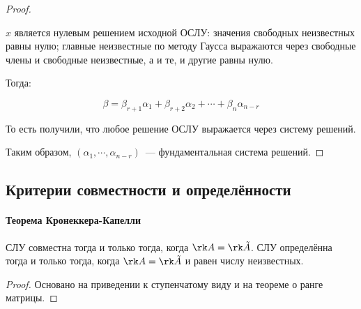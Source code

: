 \begin{proof}
\begin{enumerate}
			$x$ является нулевым решением исходной ОСЛУ: значения
			свободных неизвестных равны нулю; главные неизвестные по методу Гаусса
			выражаются через свободные члены и свободные неизвестные, а и те, и другие
			равны нулю.

			Тогда:

			$$
				\beta=
					\beta_{r+1}\alpha_1+
					\beta_{r+2}\alpha_2+
					\cdots+
					\beta_{n}\alpha_{n-r}
			$$

			То есть получили, что любое решение ОСЛУ выражается через систему решений.
	\end{enumerate}

	Таким образом, $(\alpha_1,\cdots,\alpha_{n-r})$~--- фундаментальная система решений.
\end{proof}

  \subsection{Критерии совместности и определённости}
    \paragraph{Теорема Кронеккера-Капелли}

    \begin{theorem}
      СЛУ совместна тогда и только тогда, когда $\rk A = \rk\tilde A$. СЛУ определённа тогда и только тогда, когда $\rk A=\rk\tilde A$ и равен числу неизвестных.
    \end{theorem}
    \begin{proof}
      Основано на приведении к ступенчатому виду и на теореме о ранге матрицы.
    \end{proof}
